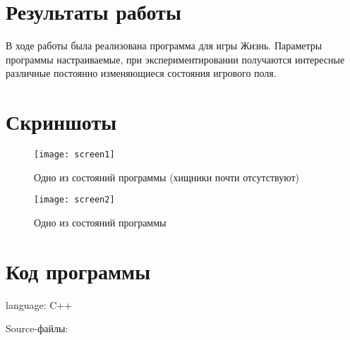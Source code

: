 \documentclass[fleqn]{article}
\begin{document}
\section{Результаты работы}

В ходе работы была реализована программа для игры Жизнь. Параметры программы настраиваемые, при экспериментировании получаются интересные различные постоянно изменяющиеся состояния игрового поля.

\newpage

\section{Скриншоты}

\begin{figure}[h!]
		\texttt{[image: screen1]}
		\caption{Одно из состояний программы (хищники почти отсутствуют)}
\end{figure}

\begin{figure}[h!]
		\texttt{[image: screen2]}
		\caption{Одно из состояний программы}
\end{figure}

\newpage

\section{Код программы}

language: C++







Source-файлы:






\end{document}
